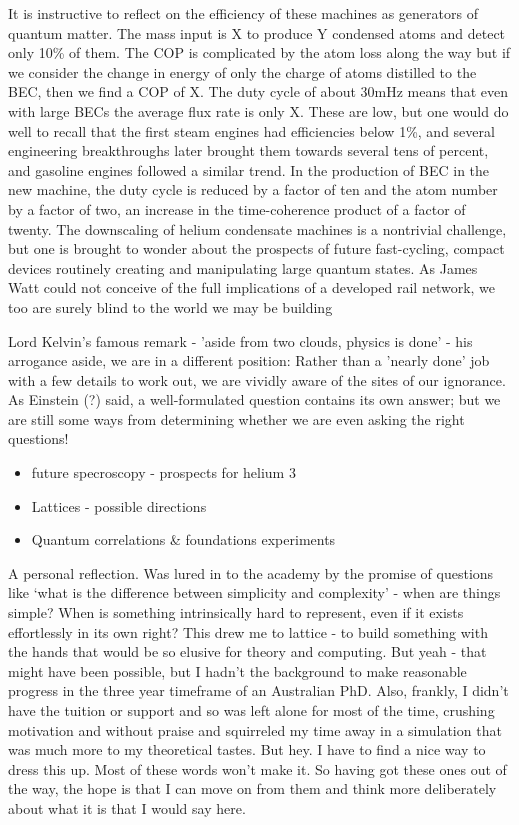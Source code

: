 It is instructive to reflect on the efficiency of these machines as generators of quantum matter.
	The mass input is X to produce Y condensed atoms and detect only 10\% of them.
	The COP is complicated by the atom loss along the way but if we consider the change in energy of only the charge of atoms distilled to the BEC, then we find a COP of X.
	The duty cycle of about 30mHz means that even with large BECs the average flux rate is only X.
	These are low, but one would do well to recall that the first steam engines had efficiencies below 1\%, and several engineering breakthroughs later brought them towards several tens of percent, and gasoline engines followed a similar trend.
	In the production of BEC in the new machine, the duty cycle is reduced by a factor of ten and the atom number by a factor of two, an increase in the time-coherence product of a factor of twenty.
	The downscaling of helium condensate machines is a nontrivial challenge, but one is brought to wonder about the prospects of future fast-cycling, compact devices routinely creating and manipulating large quantum states.
	As James Watt could not conceive of the full implications of a developed rail network, we too are surely blind to the world we may be building


Lord Kelvin's famous remark - 'aside from two clouds, physics is done' - his arrogance aside, we are in a different position: Rather than a 'nearly done' job with a few details to work out, we are vividly aware of the sites of our ignorance.
	As Einstein (?) said, a well-formulated question contains its own answer; but we are still some ways from determining whether we are even asking the right questions!

\begin{itemize}
\item
  future specroscopy - prospects for helium 3
\item
  Lattices - possible directions
\item
  Quantum correlations \& foundations experiments
\end{itemize}


A personal reflection.
	Was lured in to the academy by the promise of
questions like `what is the difference between simplicity and
complexity' - when are things simple? When is something intrinsically
hard to represent, even if it exists effortlessly in its own right? This
drew me to lattice - to build something with the hands that would be so
elusive for theory and computing.
	But yeah - that might have been
possible, but I hadn't the background to make reasonable progress in the
three year timeframe of an Australian PhD.
	Also, frankly, I didn't have
the tuition or support and so was left alone for most of the time,
crushing motivation and without praise and squirreled my time away in a
simulation that was much more to my theoretical tastes.
	But hey.
	I have
to find a nice way to dress this up.
	Most of these words won't make it.
So having got these ones out of the way, the hope is that I can move on
from them and think more deliberately about what it is that I would say
here.

